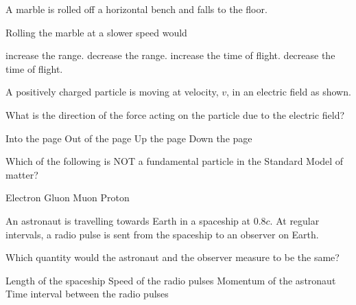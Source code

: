 \documentclass{src/hsc}
\begin{document}
\begin{mcquestions}
    \question\label{mcqfirst} A marble is rolled off a horizontal bench and falls to the floor.
    

    Rolling the marble at a slower speed would

    \begin{choices}
        \choice increase the range.
        \choice decrease the range.
        \choice increase the time of flight.
        \choice decrease the time of flight.
    \end{choices}

    \question A positively charged particle is moving at velocity, $v$, in an electric field as shown.


    What is the direction of the force acting on the particle due to the electric field?

    \begin{choices}
        \choice Into the page
        \choice Out of the page
        \choice Up the page
        \choice Down the page
    \end{choices}

    \clearpage

    \question Which of the following is NOT a fundamental particle in the Standard Model of matter?

    \begin{choices}
        \choice Electron
        \choice Gluon
        \choice Muon
        \choice Proton
    \end{choices}

    \question\label{mcqlast} An astronaut is travelling towards Earth in a spaceship at $0.8c$. At regular intervals, a radio pulse is sent from the spaceship to an observer on Earth.

    Which quantity would the astronaut and the observer measure to be the same?

    \begin{choices}
        \choice Length of the spaceship
        \choice Speed of the radio pulses
        \choice Momentum of the astronaut
        \choice Time interval between the radio pulses
    \end{choices}
\end{mcquestions}

\fillbooklet{\blankpage}
\end{document}
